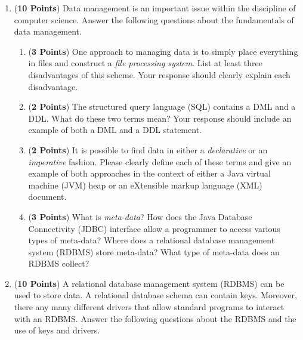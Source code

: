 \documentclass[12pt]{article}
\begin{document}
\begin{enumerate}

\item ({\bf 10 Points}) Data management is an important issue within
  the discipline of computer science.  Answer the following questions
  about the fundamentals of data management.

\begin{enumerate}

\item ({\bf 3 Points}) One approach to managing data is to simply
  place everything in files and construct a {\em file processing
    system}.  List at least three disadvantages of this scheme.  Your
  response should clearly explain each disadvantage.

\item ({\bf 2 Points}) The structured query language (SQL) contains a
  DML and a DDL.  What do these two terms mean?  Your response should
  include an example of both a DML and a DDL statement.

\item ({\bf 2 Points}) It is possible to find data in either a {\em
  declarative} or an {\em imperative} fashion.  Please clearly define
  each of these terms and give an example of both approaches in the
  context of either a Java virtual machine (JVM) heap or an eXtensible
  markup language (XML) document.


\item ({\bf 3 Points}) What is {\em meta-data}?  How does the Java
  Database Connectivity (JDBC) interface allow a programmer to access
  various types of meta-data? Where does a relational database
  management system (RDBMS) store meta-data?  What type of meta-data
  does an RDBMS collect?

\end{enumerate}

\newpage

\item ({\bf 10 Points}) A relational database management system
  (RDBMS) can be used to store data.  A relational database schema can
  contain keys.  Moreover, there any many different drivers that allow
  standard programs to interact with an RDBMS.  Answer the following
  questions about the RDBMS and the use of keys and drivers.


\end{enumerate}
\end{document}
